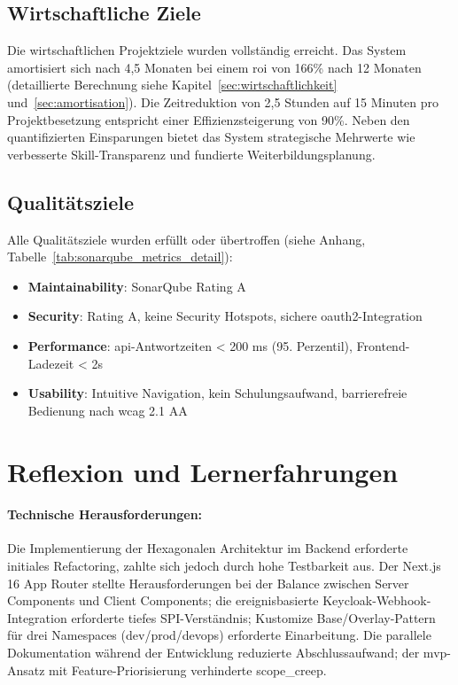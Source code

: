 \subsection{Wirtschaftliche Ziele}

Die wirtschaftlichen Projektziele wurden vollständig erreicht. Das System amortisiert sich nach 4,5 Monaten bei einem \gls{roi} von 166\% nach 12 Monaten (detaillierte Berechnung siehe Kapitel~\ref{sec:wirtschaftlichkeit} und~\ref{sec:amortisation}). Die Zeitreduktion von 2,5 Stunden auf 15 Minuten pro Projektbesetzung entspricht einer Effizienzsteigerung von 90\%. Neben den quantifizierten Einsparungen bietet das System strategische Mehrwerte wie verbesserte Skill-Transparenz und fundierte Weiterbildungsplanung.

\subsection{Qualitätsziele}

Alle Qualitätsziele wurden erfüllt oder übertroffen (siehe Anhang, Tabelle~\ref{tab:sonarqube_metrics_detail}):

\begin{itemize}[noitemsep]
    \item \textbf{Maintainability}: SonarQube\cite{sonarqube_docs} Rating A
    \item \textbf{Security}: Rating A, keine Security Hotspots, sichere \gls{oauth}2-Integration\cite{oauth2_spec}
    \item \textbf{Performance}: \gls{api}-Antwortzeiten < 200 ms (95. Perzentil), Frontend-Ladezeit < 2s\cite{web_performance}
    \item \textbf{Usability}: Intuitive Navigation, kein Schulungsaufwand, barrierefreie Bedienung nach \gls{wcag} 2.1 AA\cite{wcag}
\end{itemize}

\section{Reflexion und Lernerfahrungen}

\paragraph{Technische Herausforderungen:}
Die Implementierung der Hexagonalen Architektur im Backend erforderte initiales Refactoring, zahlte sich jedoch durch hohe Testbarkeit aus. Der Next.js 16 App Router\cite{nextjs_docs} stellte Herausforderungen bei der Balance zwischen Server Components und Client Components; die ereignisbasierte Keycloak-Webhook-Integration erforderte tiefes SPI-Verständnis; Kustomize Base/Overlay-Pattern für drei Namespaces (dev/prod/devops) erforderte Einarbeitung. Die parallele Dokumentation während der Entwicklung reduzierte Abschlussaufwand; der \gls{mvp}-Ansatz mit Feature-Priorisierung verhinderte \gls{scope_creep}.

